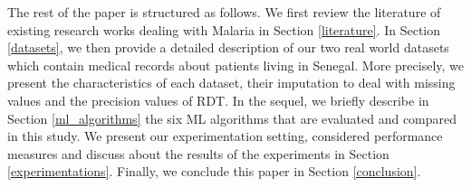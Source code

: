 The rest of the paper is structured as follows. We first review the literature of existing research works dealing with Malaria in Section \ref{literature}. In Section \ref{datasets}, we then provide a detailed description of our two real world datasets which contain medical records about patients living in Senegal. More precisely, we present the characteristics of each dataset, their imputation to deal with missing values and the precision values of RDT. In the sequel, we briefly describe in Section \ref{ml_algorithms}  the six ML algorithms that are evaluated and compared in this study. We present our experimentation setting, considered performance measures and discuss about the results of the experiments in Section \ref{experimentations}. Finally, we conclude this paper in Section \ref{conclusion}.
